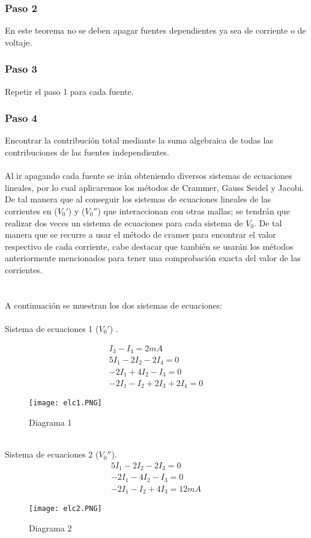 \documentclass[12pt]{article}
\begin{document}
\subsubsection*{Paso 2}
En este teorema no se deben apagar fuentes dependientes ya sea de corriente o de voltaje.
\subsubsection*{Paso 3}
Repetir el paso 1 para cada fuente.
\subsubsection*{Paso 4}
Encontrar la contribución total mediante la suma algebraica de todas las contribuciones de las fuentes independientes.
\\ \\Al ir apagando cada fuente se irán obteniendo diversos sistemas de ecuaciones lineales, por lo cual aplicaremos los métodos de Crammer, Gauss Seidel y Jacobi.\\ 

De tal manera que al conseguir los sistemas de ecuaciones lineales de las corrientes en ($V_0'$) y ($V_0''$) que interaccionan con otras mallas; se tendrán que realizar dos veces un sistema de ecuaciones para cada sistema de $V_0$. De tal manera que se recurre a usar el método de cramer para encontrar el valor respectivo de cada corriente, cabe destacar que también se usarán los métodos anteriormente mencionados para tener una comprobación exacta del valor de las corrientes.
\\ \\ \\ 
A continuación se muestran los dos sistemas de ecuaciones:
\\ \\
Sistema de ecuaciones 1 ($V_0'$) .

\begin{eqnarray}
I_{3} - I_{4} = 2mA\\
5I_{1} - 2I_{2} - 2I_{4} = 0\\
-2I_{1} + 4I_{2} - I_{3} = 0\\
-2I_{1} - I_{2} + 2I_{3} + 2I_{4} = 0
\end{eqnarray}
\begin{figure}[hbtp]
\caption{Diagrama 1}
\centering
\texttt{[image: elc1.PNG]}
\end{figure}
\\
Sistema de ecuaciones 2 ($V_0''$).
\begin{eqnarray}
5I_{1} - 2I_{2} - 2I_{3} = 0\\
-2I_{1} - 4I_{2} - I_{3} = 0\\
-2I_{1} - I_{2} + 4I_{3} = 12mA
\end{eqnarray}
\begin{figure}[hbtp]
\caption{Diagrama 2}
\centering
\texttt{[image: elc2.PNG]}
\end{figure}
\end{document}
